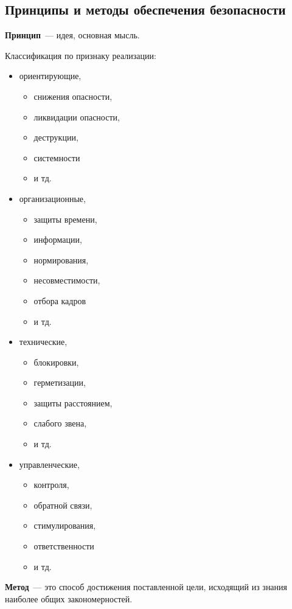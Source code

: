 \subsection{Принципы и методы обеспечения безопасности}
\textbf{Принцип}~--- идея, основная мысль.

Классификация по признаку реализации:
\begin{itemize}
	\item ориентирующие,
		\begin{itemize}
			\item снижения опасности,
			\item ликвидации опасности,
			\item деструкции,
			\item системности
			\item и тд.
		\end{itemize}
	\item организационные,
		\begin{itemize}
			\item защиты времени,
			\item информации,
			\item нормирования,
			\item несовместимости,
			\item отбора кадров
			\item и тд.
		\end{itemize}
	\item технические,
		\begin{itemize}
			\item блокировки,
			\item герметизации,
			\item защиты расстоянием,
			\item слабого звена,
			\item и тд.
		\end{itemize}
	\item управленческие,
		\begin{itemize}
			\item контроля,
			\item обратной связи,
			\item стимулирования,
			\item ответственности
			\item и тд.
		\end{itemize}
\end{itemize}

\textbf{Метод}~--- это способ достижения поставленной цели, исходящий из знания наиболее общих закономерностей.

